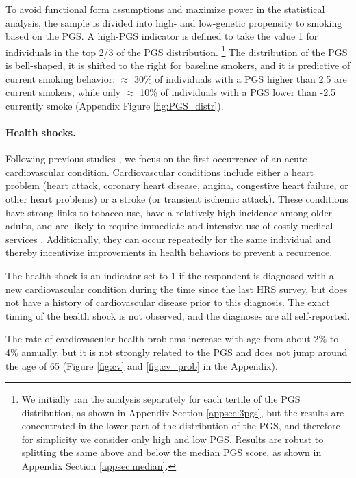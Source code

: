 \documentclass[11pt]{article}
\begin{document}
To avoid functional form assumptions and maximize power in the statistical analysis, the sample is divided into high- and low-genetic propensity to smoking based on the PGS.
A high-PGS indicator is defined to take the value 1 for individuals in the top 2/3 of the PGS distribution.%
\footnote{We initially ran the analysis separately for each tertile of the PGS distribution, as shown in Appendix Section \ref{appsec:3pgs}, but the results are concentrated in the lower part of the distribution of the PGS, and therefore for simplicity we consider only high and low PGS. Results are robust to splitting the same above and below the median PGS score, as shown in Appendix Section \ref{appsec:median}.}
The distribution of the PGS is bell-shaped, it is shifted to the right for baseline smokers, and it is predictive of current smoking behavior: $\approx$ 30\% of individuals with a PGS higher than 2.5 are current smokers, while only $\approx$ 10\% of individuals with a PGS lower than -2.5 currently smoke (Appendix Figure \ref{fig:PGS_distr}).

\paragraph{Health shocks.} Following previous studies \citep{Falba2005,Keenan2009,Khwaja2006spouse,Khwaja2006learn,Smith2001}, we focus on the first occurrence of an acute cardiovascular condition.
Cardiovascular conditions include either a heart problem (heart attack, coronary heart disease, angina, congestive heart failure, or other heart problems) or a stroke (or transient ischemic attack).
These conditions have strong links to tobacco use, have a relatively high incidence among older adults, and are likely to require immediate and intensive use of costly medical services \citep{Thorpe2004,Teo2006,Lloyd-Jones2010}.
Additionally, they can occur repeatedly for the same individual and thereby incentivize improvements in health behaviors to prevent a recurrence.

The health shock is an indicator set to 1 if the respondent is diagnosed with a new cardiovascular condition during the time since the last HRS survey, but does not have a history of cardiovascular disease prior to this diagnosis.
The exact timing of the health shock is not observed, and the diagnoses are all self-reported.

The rate of cardiovascular health problems increase with age from about 2\% to 4\% annually, but it is not strongly related to the PGS and does not jump around the age of 65 (Figure \ref{fig:cv} and \ref{fig:cv_prob} in the Appendix).
\end{document}
